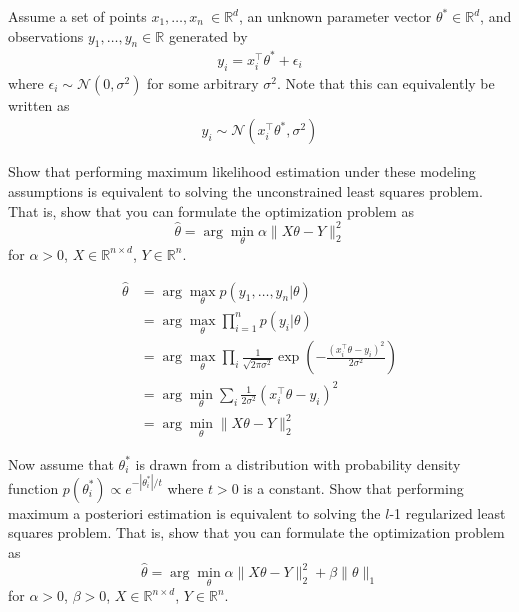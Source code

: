 Assume a set of points $x_1, \ldots, x_n \ \in \mathbb R^d$, an unknown parameter vector $\theta^* \in \mathbb R^d$, and observations $y_1, \ldots, y_n \in \mathbb R$ generated by
\begin{align*}
	y_i = x_i ^\top \theta^* + \epsilon_i
\end{align*}
where $\epsilon_i \sim \mathcal N(0, \sigma^2)$ for some arbitrary $\sigma^2$. Note that this can equivalently be written as
\begin{align*}
y_i \sim \mathcal N (x_i ^\top \theta^*, \sigma^2)
\end{align*}
\begin{Parts}
\Part Show that performing maximum likelihood estimation under these modeling assumptions is equivalent to solving the unconstrained least squares problem. That is, show that you can formulate the optimization problem as 
\begin{equation}
\hat \theta = \arg \min_\theta \alpha \| X\theta - Y\|^2_2
\end{equation}\label{eq:unreg} 
for $\alpha > 0$, $X \in \mathbb R^{n \times d}$, $Y \in \mathbb R^n$.

\begin{solution}
\begin{align*}
	\hat \theta & = \arg\max_\theta p(y_1, \ldots, y_n | \theta) \\
	& = \arg\max_\theta \prod_{i = 1}^n p(y_i | \theta) \\
	& = \arg\max_\theta \prod_i \frac{1}{\sqrt{2\pi \sigma^2}} \exp\left( - \frac{\left( x_i ^\top \theta - y_i \right)^2}{2\sigma^2}\right) \\
	& = \arg\min_\theta \sum_i \frac{1}{2\sigma^2} \left( x_i^\top \theta - y_i\right)^2 \\
	& = \arg\min_\theta \| X\theta - Y\|_2^2
\end{align*}
\end{solution}

\Part  Now assume that $\theta^*_i$ is drawn from a distribution with probability density function $p(\theta_i^*) \propto e^{-|\theta_i^*|/t}$ where $t > 0$ is a constant. Show that performing maximum a posteriori estimation is equivalent to solving the $l$-1 regularized least squares problem. That is, show that you can formulate the optimization problem as
\begin{equation}\label{eq:lasso}
 \hat \theta = \arg\min_\theta \alpha \| X\theta - Y\|^2_2 + \beta \|\theta\|_1
\end{equation}
for $\alpha > 0$, $\beta > 0$, $X \in \mathbb R^{n \times d}$, $Y \in \mathbb R^n$.


\end{Parts}
